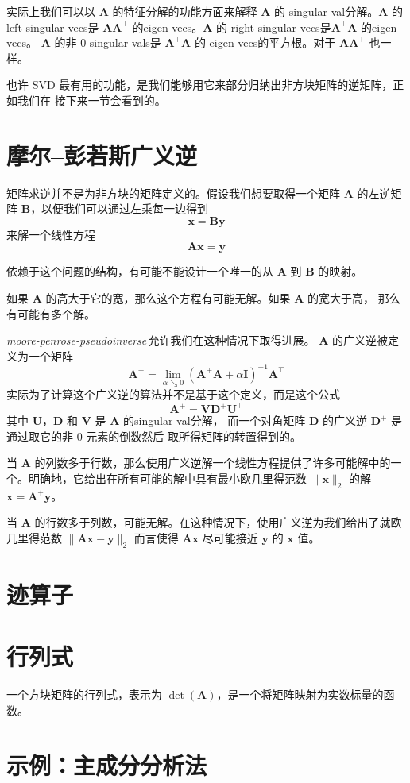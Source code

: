 实际上我们可以以 $\pmb{A}$ 的特征分解的功能方面来解释 $\pmb{A}$ 的
\gls*{singular-val}分解。$\pmb{A}$ 的\gls*{left-singular-vecs}是
$\pmb{A}\pmb{A}^{\top}$ 的\gls*{eigen-vecs}。$\pmb{A}$ 的
\gls*{right-singular-vecs}是$\pmb{A}^{\top}\pmb{A}$ 的\gls*{eigen-vecs}。
$\pmb{A}$ 的非 $0$ \gls*{singular-vals}是 $\pmb{A}^{\top}\pmb{A}$ 的
\gls*{eigen-vecs}的平方根。对于 $\pmb{A}\pmb{A}^{\top}$ 也一样。

也许 SVD 最有用的功能，是我们能够用它来部分归纳出非方块矩阵的逆矩阵，正如我们在
接下来一节会看到的。

\section{摩尔--彭若斯广义逆}
\label{sec:the_moore_penrose_pseudoinverse}

矩阵求逆并不是为非方块的矩阵定义的。假设我们想要取得一个矩阵 $\pmb{A}$ 的左逆矩
阵 $\pmb{B}$，以便我们可以通过左乘每一边得到
\begin{equation}
  \pmb{x} = \pmb{B}\pmb{y}
\end{equation}
来解一个线性方程
\begin{equation}
  \pmb{A}\pmb{x} = \pmb{y}
\end{equation}

依赖于这个问题的结构，有可能不能设计一个唯一的从 $\pmb{A}$ 到 $\pmb{B}$ 的映射。

如果 $\pmb{A}$ 的高大于它的宽，那么这个方程有可能无解。如果 $\pmb{A}$ 的宽大于高，
那么有可能有多个解。

\emph{\gls{moore-penrose-pseudoinverse}}\,允许我们在这种情况下取得进展。
$\pmb{A}$ 的广义逆被定义为一个矩阵
\begin{equation}
  \pmb{A}^+ = \lim_{\alpha \searrow 0}(\pmb{A}^+\pmb{A} +
  \alpha\pmb{I})^{-1}\pmb{A}^{\top}
\end{equation}
实际为了计算这个广义逆的算法并不是基于这个定义，而是这个公式
\begin{equation}
  \pmb{A}^+ = \pmb{V}\pmb{D}^+\pmb{U}^{\top}
\end{equation}
其中 $\pmb{U}$，$\pmb{D}$ 和 $\pmb{V}$ 是 $\pmb{A}$ 的\gls*{singular-val}分解，
而一个对角矩阵 $\pmb{D}$ 的广义逆 $\pmb{D}^+$ 是通过取它的非 $0$ 元素的倒数然后
取所得矩阵的转置得到的。

当 $\pmb{A}$ 的列数多于行数，那么使用广义逆解一个线性方程提供了许多可能解中的一
个。明确地，它给出在所有可能的解中具有最小欧几里得范数 $\|\pmb{x}\|_2$ 的解
$\pmb{x} = \pmb{A}^+\pmb{y}$。

当 $\pmb{A}$ 的行数多于列数，可能无解。在这种情况下，使用广义逆为我们给出了就欧
几里得范数 $\|\pmb{A}\pmb{x} - \pmb{y}\|_2$ 而言使得 $\pmb{A}\pmb{x}$ 尽可能接近
$\pmb{y}$ 的 $\pmb{x}$ 值。

\section{迹算子}
\label{sec:the_trace_operator}

\section{行列式}
\label{sec:the_determinant}

一个方块矩阵的行列式，表示为 $\det(\pmb{A})$，是一个将矩阵映射为实数标量的函数。

\section{示例：主成分分析法}
\label{sec:example:principal_components_analysis}

